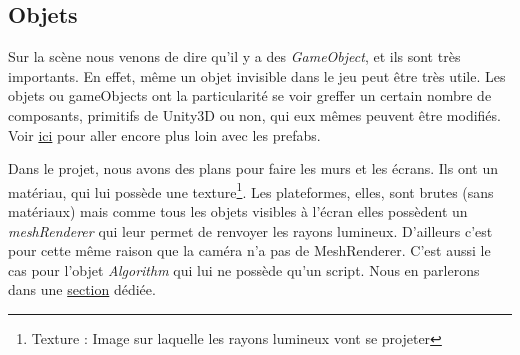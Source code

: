 \documentclass[a4paper,11pt]{myreport}
\begin{document}
	\newpage
	\subsection{Objets}
	\par Sur la scène nous venons de dire qu'il y a des \textit{GameObject}, et ils sont très importants. En effet, même un objet invisible dans le jeu peut être très utile.
	Les objets ou gameObjects ont la particularité se voir greffer un certain nombre de composants, primitifs de Unity3D ou non, qui eux mêmes peuvent être modifiés. Voir \hyperlink{prefabTarget}{ici} pour aller encore plus loin avec les prefabs.

	\par Dans le projet, nous avons des plans pour faire les murs et les écrans. Ils ont un matériau, qui lui possède une texture\footnote{Texture : Image sur laquelle les rayons lumineux vont se projeter}. Les plateformes, elles, sont brutes (sans matériaux) mais comme tous les objets visibles à l'écran elles possèdent un \textit{meshRenderer} qui leur permet de renvoyer les rayons lumineux. D'ailleurs c'est pour cette même raison que la caméra n'a pas de MeshRenderer. C'est aussi le cas pour l'objet \textit{Algorithm} qui lui ne possède qu'un script. Nous en parlerons dans une \hyperlink{prefabTarget}{section} dédiée.
\end{document}
